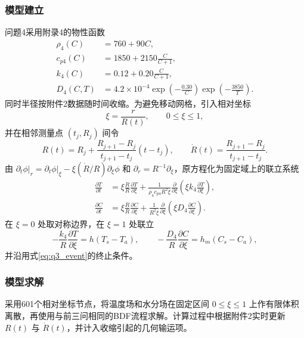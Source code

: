 \documentclass[12pt,a4paper,fontset=none]{ctexart}
\begin{document}
\subsubsection{模型建立}
问题4采用附录4的物性函数
\begin{equation}
\begin{aligned}
\rho_4(C)&=760+90C,\\
c_{p4}(C)&=1850+2150\frac{C}{C+1},\\
k_4(C)&=0.12+0.20\frac{C}{C+1},\\
D_4(C,T)&=4.2\times10^{-4}
\exp\!\left(-\frac{0.30}{C}\right)
\exp\!\left(-\frac{3850}{T}\right).
\end{aligned}\label{eq:q4_properties}
\end{equation}
同时半径按附件2数据随时间收缩。为避免移动网格，引入相对坐标
\begin{equation}
\xi=\frac{r}{R(t)},\qquad 0\le\xi\le1,
\end{equation}
并在相邻测量点 $(t_j,R_j)$ 间令
\begin{equation}
R(t)=R_j+\frac{R_{j+1}-R_j}{t_{j+1}-t_j}(t-t_j),\qquad
\dot R(t)=\frac{R_{j+1}-R_j}{t_{j+1}-t_j}.
\end{equation}
由
$\left.\partial_t\phi\right|_r=\left.\partial_t\phi\right|_\xi-
\xi(\dot R/R)\partial_\xi\phi$ 和
$\partial_r=R^{-1}\partial_\xi$，原方程化为固定域上的联立系统
\begin{align}
\frac{\partial T}{\partial t}
&=\xi\frac{\dot R}{R}\frac{\partial T}{\partial\xi}
+\frac{1}{\rho_4c_{p4}R^2\xi}
\frac{\partial}{\partial\xi}\!\left(\xi k_4\frac{\partial T}{\partial\xi}\right),
\label{eq:movingT}\\
\frac{\partial C}{\partial t}
&=\xi\frac{\dot R}{R}\frac{\partial C}{\partial\xi}
+\frac{1}{R^2\xi}
\frac{\partial}{\partial\xi}\!\left(\xi D_4\frac{\partial C}{\partial\xi}\right).
\label{eq:movingC}
\end{align}
在 $\xi=0$ 处取对称边界，在 $\xi=1$ 处联立
\begin{equation}
-\frac{k_4}{R}\frac{\partial T}{\partial\xi}=h(T_s-T_a),\qquad
-\frac{D_4}{R}\frac{\partial C}{\partial\xi}=h_m(C_s-C_a),
\end{equation}
并沿用式\eqref{eq:q3_event}的终止条件。

\subsubsection{模型求解}
采用601个相对坐标节点，将温度场和水分场在固定区间 $0\le\xi\le1$ 上作有限体积离散，再使用与前三问相同的BDF流程求解。计算过程中根据附件2实时更新 $R(t)$ 与 $\dot R(t)$，并计入收缩引起的几何输运项。
\end{document}
